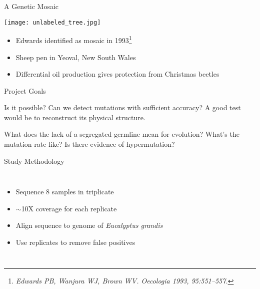 \documentclass{beamer}
\begin{document}
\begin{frame}{A Genetic Mosaic}
	\begin{center}
	\texttt{[image: unlabeled\_tree.jpg]}
	\end{center}
	\begin{itemize}
		\item Edwards identified as mosaic in 1993\footnote{\textit{Edwards PB, Wanjura WJ, Brown WV. Oecologia 1993, 95:551–557.}}
		\item Sheep pen in Yeoval, New South Wales
		\item Differential oil production gives protection from Christmas beetles
	\end{itemize}
\end{frame}

\begin{frame}{Project Goals}

\begin{block}{Is it possible?}
Can we detect mutations with sufficient accuracy? A good test would be to reconstruct its physical structure.
\end{block}

\begin{exampleblock}{What does the lack of a segregated germline mean for evolution?}
What's the mutation rate like? Is there evidence of hypermutation?
\end{exampleblock}

\end{frame}


\begin{frame}{Study Methodology}
\begin{columns}

\begin{itemize}
\item Sequence 8 samples in triplicate
\item $\sim$10X coverage for each replicate
\item Align sequence to genome of \textit{Eucalyptus grandis}
\item Use replicates to remove false positives
\end{itemize}

\begin{center}
\end{center}
\end{columns}
\end{frame}
\end{document}
